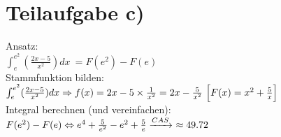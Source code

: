 \documentclass[11pt, a4paper]{report}
\begin{document}
	\section{Teilaufgabe c)}
	Ansatz:
	\\
	$\int_{e}^{e^2} (\frac{2x - 5}{x^2}) dx\ = F(e^2) - F(e)$
	\\
	Stammfunktion bilden:
	\\
	$
	\int_{e}^{e^2} (\frac{2x - 5}{x^2}) dx \Rightarrow f(x) = 2x - 5 \times \frac{1}{x^2} = 2x - \frac{5}{x^2}\ \Bigl[F(x) = x^2 + \frac{5}{x}\Bigl]
	$
	\\
	Integral berechnen (und vereinfachen):
	\\
	$
	F(e^2) - F(e) \\
	\Leftrightarrow e^4 + \frac{5}{e^2} - e^2 + \frac{5}{e} \\
	\xrightarrow[]{CAS}\ \approx 49.72
	$
	
\end{document}

